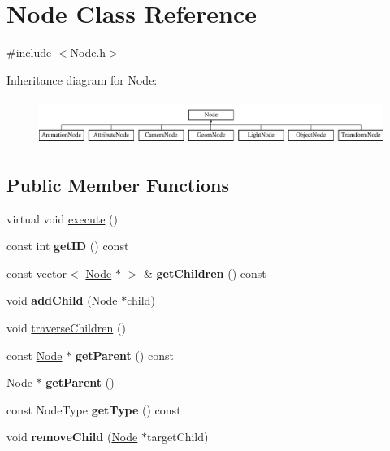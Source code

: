 \hypertarget{classNode}{\section{Node Class Reference}
\label{classNode}
}


{\ttfamily \#include $<$Node.\-h$>$}

Inheritance diagram for Node\-:\begin{figure}[H]
\begin{center}
\leavevmode
\includegraphics[height=1.495327cm]{classNode}
\end{center}
\end{figure}
\subsection*{Public Member Functions}
\begin{DoxyCompactItemize}
\item 
virtual void \hyperlink{classNode_a6890991303fcc6c9b2b3dec678c8b5db}{execute} ()
\item 
\hypertarget{classNode_ae17dff73e3a5026946eaf24920454e9d}{const int {\bfseries get\-I\-D} () const }\label{classNode_ae17dff73e3a5026946eaf24920454e9d}

\item 
\hypertarget{classNode_a599186538d9354a563ea7175ed85ca4b}{const vector$<$ \hyperlink{classNode}{Node} $\ast$ $>$ \& {\bfseries get\-Children} () const }\label{classNode_a599186538d9354a563ea7175ed85ca4b}

\item 
\hypertarget{classNode_a132699398b350e83b548a5645e69beb0}{void {\bfseries add\-Child} (\hyperlink{classNode}{Node} $\ast$child)}\label{classNode_a132699398b350e83b548a5645e69beb0}

\item 
void \hyperlink{classNode_ad0665d6541266c8bdbdc3169674cb6ae}{traverse\-Children} ()
\item 
\hypertarget{classNode_a1f2cee9006b507c74d4c0efc2a0f0b19}{const \hyperlink{classNode}{Node} $\ast$ {\bfseries get\-Parent} () const }\label{classNode_a1f2cee9006b507c74d4c0efc2a0f0b19}

\item 
\hypertarget{classNode_a220a8d64cb0df1cce083ed38c1260615}{\hyperlink{classNode}{Node} $\ast$ {\bfseries get\-Parent} ()}\label{classNode_a220a8d64cb0df1cce083ed38c1260615}

\item 
\hypertarget{classNode_a06dbfc5f19f4e527619e2bd99881bd91}{const Node\-Type {\bfseries get\-Type} () const }\label{classNode_a06dbfc5f19f4e527619e2bd99881bd91}

\item 
\hypertarget{classNode_a3a2abb80f0a1b618161615353e889d3e}{void {\bfseries remove\-Child} (\hyperlink{classNode}{Node} $\ast$target\-Child)}\label{classNode_a3a2abb80f0a1b618161615353e889d3e}

\end{DoxyCompactItemize}
